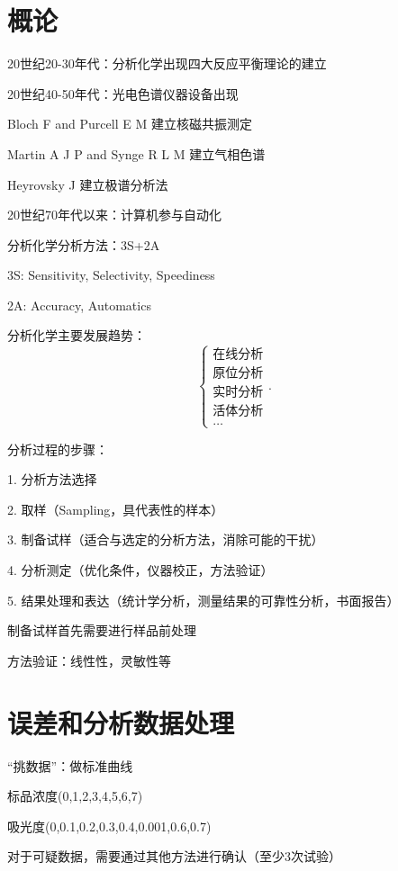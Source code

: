 \section{概论}%
\label{sec:概论}
20世纪20-30年代：分析化学出现四大反应平衡理论的建立

20世纪40-50年代：光电色谱仪器设备出现
\begin{notation}
    Bloch F and Purcell E M 建立核磁共振测定

    Martin A J P and Synge R L M 建立气相色谱

    Heyrovsky J 建立极谱分析法
\end{notation}
20世纪70年代以来：计算机参与自动化
\begin{notation}
    分析化学分析方法：3S+2A

    3S: Sensitivity, Selectivity, Speediness
    
    2A: Accuracy, Automatics
\end{notation}
分析化学主要发展趋势：
\[
    \begin{cases}
        \text{在线分析}\\ 
        \text{原位分析}\\ 
        \text{实时分析}\\ 
        \text{活体分析}\\ 
        \ldots
    \end{cases}
.\] 
\begin{notation}
    分析过程的步骤：

    1. 分析方法选择

    2. 取样（Sampling，具代表性的样本）

    3. 制备试样（适合与选定的分析方法，消除可能的干扰）

    4. 分析测定（优化条件，仪器校正，方法验证）

    5. 结果处理和表达（统计学分析，测量结果的可靠性分析，书面报告）
\end{notation}
\begin{notation}
    制备试样首先需要进行样品前处理

    方法验证：线性性，灵敏性等
\end{notation}
\section{误差和分析数据处理}%
\label{sec:误差和分析数据处理}
\begin{notation}
    “挑数据”：做标准曲线

    标品浓度(0,1,2,3,4,5,6,7)

    吸光度(0,0.1,0.2,0.3,0.4,0.001,0.6,0.7)

    对于可疑数据，需要通过其他方法进行确认（至少3次试验）
\end{notation}
